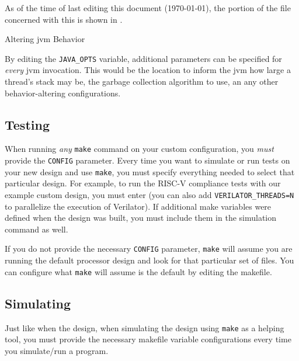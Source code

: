 As of the time of last editing this document (\today), the portion of the file concerned with this is shown in .

\begin{listing}[h!tbp]
\caption{Altering \Gls{jvm} Behavior}
\label{lst:Altering_JVM_Behavior}
\end{listing}

By editing the \texttt{JAVA_OPTS} variable, additional parameters can be specified for \emph{every} \Gls{jvm} invocation.
This would be the location to inform the \Gls{jvm} how large a thread's stack may be, the garbage collection algorithm to use, an any other behavior-altering configurations.

\subsection{Testing}\label{sec:Custom_Config-Testing}
When running \emph{any} \texttt{make} command on your custom configuration, you \emph{must} provide the \texttt{CONFIG} parameter.
Every time you want to simulate or run tests on your new design and use \texttt{make}, you must specify everything needed to select that particular design.
For example, to run the RISC-V compliance tests with our example custom design, you must enter  (you can also add \texttt{VERILATOR_THREADS=N} to parallelize the execution of Verilator).
If additional make variables were defined when the design was built, you must include them in the simulation command as well.

\begin{blackbox}
  If you do not provide the necessary \texttt{CONFIG} parameter, \texttt{make} will assume you are running the default processor design and look for that particular set of files.
  You can configure what \texttt{make} will assume is the default by editing the  makefile.
\end{blackbox}

\subsection{Simulating}\label{sec:Custom_Config-Simulating}
Just like when  the design, when simulating the design using \texttt{make} as a helping tool, you must provide the necessary makefile variable configurations every time you simulate/run a program.

